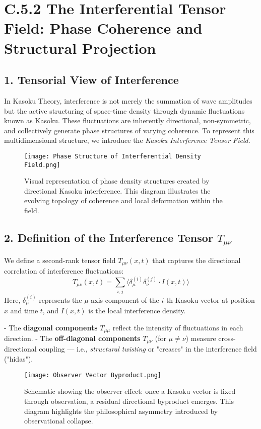 
\section*{C.5.2 The Interferential Tensor Field: Phase Coherence and Structural Projection}

\subsection*{1. Tensorial View of Interference}
In Kasoku Theory, interference is not merely the summation of wave amplitudes but the active structuring of space-time density through dynamic fluctuations known as Kasoku. These fluctuations are inherently directional, non-symmetric, and collectively generate phase structures of varying coherence. To represent this multidimensional structure, we introduce the \emph{Kasoku Interference Tensor Field}.

\begin{figure}[h!]
\centering
\texttt{[image: Phase Structure of Interferential Density Field.png]}
\caption{Visual representation of phase density structures created by directional Kasoku interference. This diagram illustrates the evolving topology of coherence and local deformation within the field.}
\end{figure}

\subsection*{2. Definition of the Interference Tensor \( T_{\mu\nu} \)}
We define a second-rank tensor field \( T_{\mu\nu}(x,t) \) that captures the directional correlation of interference fluctuations:
\[
T_{\mu\nu}(x,t) = \sum_{i,j} \langle \delta_\mu^{(i)} \delta_\nu^{(j)} \cdot I(x,t) \rangle
\]
Here, \( \delta_\mu^{(i)} \) represents the \( \mu \)-axis component of the \( i \)-th Kasoku vector at position \( x \) and time \( t \), and \( I(x,t) \) is the local interference density.

- The \textbf{diagonal components} \( T_{\mu\mu} \) reflect the intensity of fluctuations in each direction.
- The \textbf{off-diagonal components} \( T_{\mu\nu} \) (for \( \mu \ne \nu \)) measure cross-directional coupling — i.e., \emph{structural twisting} or "creases" in the interference field ("hidas").

\begin{figure}[h!]
\centering
\texttt{[image: Observer Vector Byproduct.png]}
\caption{Schematic showing the observer effect: once a Kasoku vector is fixed through observation, a residual directional byproduct emerges. This diagram highlights the philosophical asymmetry introduced by observational collapse.}
\end{figure}

